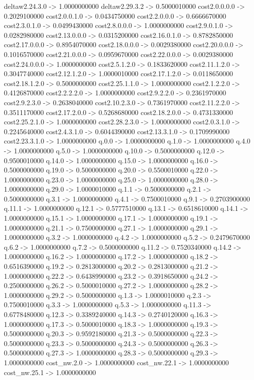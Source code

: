    deltaw2.24.3.0 -> 1.0000000000    deltaw2.29.3.2 -> 0.5000010000    cost2.0.0.0.0 -> 0.2029100000    cost2.0.0.1.0 -> 0.0434750000    cost2.2.0.0.0 -> 0.6666670000    cost2.3.0.1.0 -> 0.0499430000    cost2.8.0.0.0 -> 1.0000000000    cost2.9.0.1.0 -> 0.0282980000    cost2.13.0.0.0 -> 0.0315200000    cost2.16.0.1.0 -> 0.8782850000    cost2.17.0.0.0 -> 0.8954070000    cost2.18.0.0.0 -> 0.0029380000    cost2.20.0.0.0 -> 0.1016570000    cost2.21.0.0.0 -> 0.0959670000    cost2.22.0.0.0 -> 0.0029380000    cost2.24.0.0.0 -> 1.0000000000    cost2.5.1.2.0 -> 0.1833620000    cost2.11.1.2.0 -> 0.3047740000    cost2.12.1.2.0 -> 1.0000010000    cost2.17.1.2.0 -> 0.0118650000    cost2.18.1.2.0 -> 0.5000000000    cost2.25.1.1.0 -> 1.0000000000    cost2.1.2.2.0 -> 0.4126870000    cost2.2.2.2.0 -> 1.0000000000    cost2.9.2.2.0 -> 0.2361970000    cost2.9.2.3.0 -> 0.2638040000    cost2.10.2.3.0 -> 0.7361970000    cost2.11.2.2.0 -> 0.3511170000    cost2.17.2.0.0 -> 0.5268680000    cost2.18.2.0.0 -> 0.4731330000    cost2.25.2.1.0 -> 1.0000000000    cost2.28.2.3.0 -> 1.0000000000    cost2.0.3.1.0 -> 0.2245640000    cost2.4.3.1.0 -> 0.6044390000    cost2.13.3.1.0 -> 0.1709990000    cost2.23.3.1.0 -> 1.0000000000    q.0.0 -> 1.0000000000    q.1.0 -> 1.0000000000    q.4.0 -> 1.0000000000    q.5.0 -> 1.0000000000    q.10.0 -> 0.5000000000    q.12.0 -> 0.9500010000    q.14.0 -> 1.0000000000    q.15.0 -> 1.0000000000    q.16.0 -> 0.5000000000    q.19.0 -> 0.5000000000    q.20.0 -> 0.5500010000    q.22.0 -> 1.0000000000    q.23.0 -> 1.0000000000    q.25.0 -> 1.0000000000    q.28.0 -> 1.0000000000    q.29.0 -> 1.0000010000    q.1.1 -> 0.5000000000    q.2.1 -> 0.5000000000    q.3.1 -> 1.0000000000    q.4.1 -> 0.7500010000    q.9.1 -> 0.2703900000    q.11.1 -> 1.0000000000    q.12.1 -> 0.5777510000    q.13.1 -> 0.6518610000    q.14.1 -> 1.0000000000    q.15.1 -> 1.0000000000    q.17.1 -> 1.0000000000    q.19.1 -> 1.0000000000    q.21.1 -> 0.7500000000    q.27.1 -> 1.0000000000    q.29.1 -> 1.0000000000    q.3.2 -> 1.0000000000    q.4.2 -> 1.0000000000    q.5.2 -> 0.2479670000    q.6.2 -> 1.0000000000    q.7.2 -> 0.5000000000    q.11.2 -> 0.7520340000    q.14.2 -> 1.0000000000    q.16.2 -> 1.0000000000    q.17.2 -> 1.0000000000    q.18.2 -> 0.6516390000    q.19.2 -> 0.2813000000    q.20.2 -> 0.2813000000    q.21.2 -> 1.0000000000    q.22.2 -> 0.6438990000    q.23.2 -> 0.3918650000    q.24.2 -> 0.2500000000    q.26.2 -> 0.5000010000    q.27.2 -> 1.0000000000    q.28.2 -> 1.0000000000    q.29.2 -> 0.5000000000    q.1.3 -> 1.0000010000    q.2.3 -> 0.7500010000    q.3.3 -> 1.0000000000    q.5.3 -> 1.0000000000    q.11.3 -> 0.6778480000    q.12.3 -> 0.3389240000    q.14.3 -> 0.2740120000    q.16.3 -> 1.0000000000    q.17.3 -> 0.5000010000    q.18.3 -> 1.0000000000    q.19.3 -> 0.5000000000    q.20.3 -> 0.9592180000    q.21.3 -> 0.5000000000    q.22.3 -> 0.5000000000    q.23.3 -> 0.5000000000    q.24.3 -> 0.5000000000    q.26.3 -> 0.5000000000    q.27.3 -> 1.0000000000    q.28.3 -> 0.5000000000    q.29.3 -> 1.0000000000    cost_nw.2.0 -> 1.0000000000    cost_nw.22.1 -> 1.0000000000    cost_nw.25.1 -> 1.0000000000    

